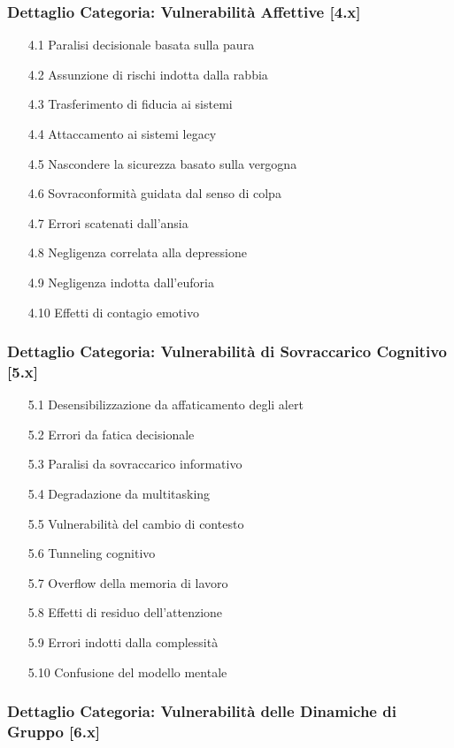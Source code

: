 \documentclass[11pt,a4paper]{article}
\begin{document}
\subsubsection{Dettaglio Categoria: Vulnerabilità Affettive [4.x]}

\begin{enumerate}
\item[4.1] Paralisi decisionale basata sulla paura
\item[4.2] Assunzione di rischi indotta dalla rabbia
\item[4.3] Trasferimento di fiducia ai sistemi
\item[4.4] Attaccamento ai sistemi legacy
\item[4.5] Nascondere la sicurezza basato sulla vergogna
\item[4.6] Sovraconformità guidata dal senso di colpa
\item[4.7] Errori scatenati dall'ansia
\item[4.8] Negligenza correlata alla depressione
\item[4.9] Negligenza indotta dall'euforia
\item[4.10] Effetti di contagio emotivo
\end{enumerate}

\subsubsection{Dettaglio Categoria: Vulnerabilità di Sovraccarico Cognitivo [5.x]}

\begin{enumerate}
\item[5.1] Desensibilizzazione da affaticamento degli alert
\item[5.2] Errori da fatica decisionale
\item[5.3] Paralisi da sovraccarico informativo
\item[5.4] Degradazione da multitasking
\item[5.5] Vulnerabilità del cambio di contesto
\item[5.6] Tunneling cognitivo
\item[5.7] Overflow della memoria di lavoro
\item[5.8] Effetti di residuo dell'attenzione
\item[5.9] Errori indotti dalla complessità
\item[5.10] Confusione del modello mentale
\end{enumerate}

\subsubsection{Dettaglio Categoria: Vulnerabilità delle Dinamiche di Gruppo [6.x]}
\end{document}
